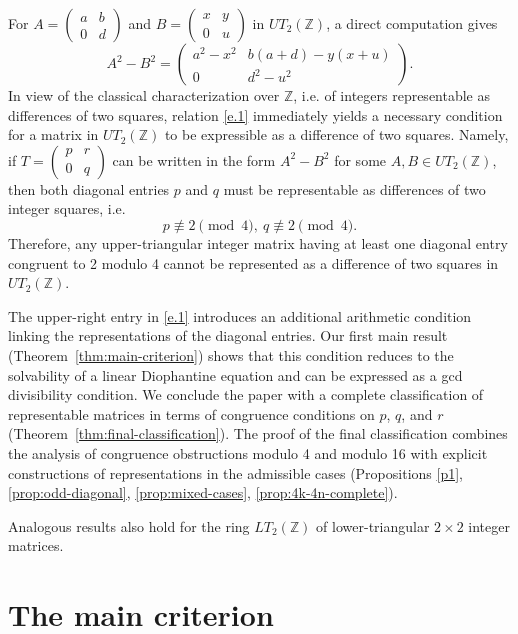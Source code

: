 \documentclass[11pt]{amsart}
\def\Z{\mathbb{Z}}
\begin{document}
For $A=\begin{pmatrix}a&b\\0&d\end{pmatrix}$ and 
$B=\begin{pmatrix}x&y\\0&u\end{pmatrix}$ in $UT_2(\Z)$, a direct computation gives
\begin{equation}\label{e.1}
    A^2-B^2=
\begin{pmatrix}
 a^2-x^2 & b(a+d)-y(x+u)\\
 0 & d^2-u^2
\end{pmatrix}.
\end{equation}
In view of the classical characterization over $\Z$, i.e. of integers representable as differences of two squares, relation \eqref{e.1} immediately yields a necessary condition for a matrix in $UT_2(\Z)$ to be expressible as a difference of two squares. Namely, if $T=\begin{pmatrix}p&r\\0&q\end{pmatrix}$ can be written in the form $A^2-B^2$ for some $A,B\in UT_2(\Z)$, then both diagonal entries $p$ and $q$ must be representable as differences of two integer squares, i.e.
$$ p\not\equiv2\pmod 4,~ q\not\equiv2\pmod 4.$$
Therefore, any upper-triangular integer matrix having at least one diagonal entry congruent to 2 modulo 4 cannot be represented as a difference of two squares in $UT_2(\Z)$. 

The upper-right entry in \eqref{e.1} introduces an additional arithmetic condition linking the representations of the diagonal entries. Our first main result (Theorem~\ref{thm:main-criterion}) shows that this condition reduces to the solvability of a linear Diophantine equation and can be expressed as a gcd divisibility condition. We conclude the paper with a complete classification of representable matrices in terms of congruence conditions on $p$, $q$, and $r$ (Theorem~\ref{thm:final-classification}).  The proof of the final classification combines the analysis of congruence obstructions modulo 4 and modulo 16 with explicit constructions of representations in the admissible cases (Propositions \ref{p1}, \ref{prop:odd-diagonal}, \ref{prop:mixed-cases}, \ref{prop:4k-4n-complete}).


 Analogous results also hold for the ring $LT_2(\Z)$ of lower-triangular $2\times 2$ integer matrices.



\section{The main criterion}
\end{document}
